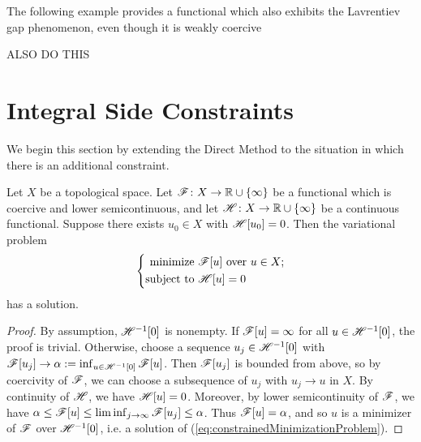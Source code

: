 The following example provides a functional which also exhibits the Lavrentiev gap phenomenon, even though it is weakly coercive 
\begin{example}
    {\color{red} ALSO DO THIS}
\end{example}

\section{Integral Side Constraints}
We begin this section by extending the Direct Method to the situation in which there is an additional constraint.
\begin{theorem}
    Let $X$ be a topological space. Let $\mathscr{F} \colon X \to \mathbb{R} \cup \left\{ {\infty} \right\}$ be a functional which is coercive and lower semicontinuous, and let $\mathscr{H} \colon X \to \mathbb{R} \cup \left\{ {\infty} \right\}$ be a continuous functional. Suppose there exists $u_0 \in X$ with $\mathscr{H}[u_0] = 0$. Then the variational problem 
    \begin{equation} \label{eq:constrainedMinimizationProblem}
        \left\{
        \begin{aligned}
            \text{minimize }   &\mathscr{F}[u] \text{ over } u \in X; \\
            \text{subject to } &\mathscr{H}[u] = 0
        \end{aligned}
        \right.
    \end{equation}
    has a solution.
\end{theorem}
\begin{proof}
    By assumption, $\mathscr{H}^{-1}[0]$ is nonempty. If $\mathscr{F}[u] = \infty$ for all $u \in \mathscr{H}^{-1}[0]$, the proof is trivial. Otherwise, choose a sequence $u_j \in \mathscr{H}^{-1}[0]$ with $\mathscr{F}[u_j] \rightarrow \alpha := \inf_{u \in \mathscr{H}^{-1}[0]} \mathscr{F}[u]$. Then $\mathscr{F}[u_j]$ is bounded from above, so by coercivity of $\mathscr{F}$, we can choose a subsequence of $u_j$ with $u_j \rightarrow u$ in $X$. By continuity of $\mathscr{H}$, we have $\mathscr{H}[u] = 0$. Moreover, by lower semicontinuity of $\mathscr{F}$, we have $\alpha \leq \mathscr{F}[u] \leq \liminf_{j \to \infty} \mathscr{F}[u_j] \leq \alpha$. Thus $\mathscr{F}[u] = \alpha$, and so $u$ is a minimizer of $\mathscr{F}$ over $\mathscr{H}^{-1}[0]$, i.e. a solution of (\ref{eq:constrainedMinimizationProblem}).
\end{proof} 

